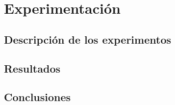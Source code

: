 \chapter{Experimentación}

\section{Descripción de los experimentos}

\section{Resultados}

\section{Conclusiones}